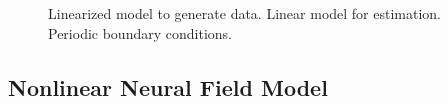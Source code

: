 \documentclass[conference,onecolumn]{IEEEtran}
\begin{document}
\begin{figure}[htbp]
	\centering
	\caption{Linearized model to generate data. Linear model for estimation. Periodic boundary conditions.}
	\label{fig:label}
\end{figure}

\subsection{Nonlinear Neural Field Model}
\end{document}

